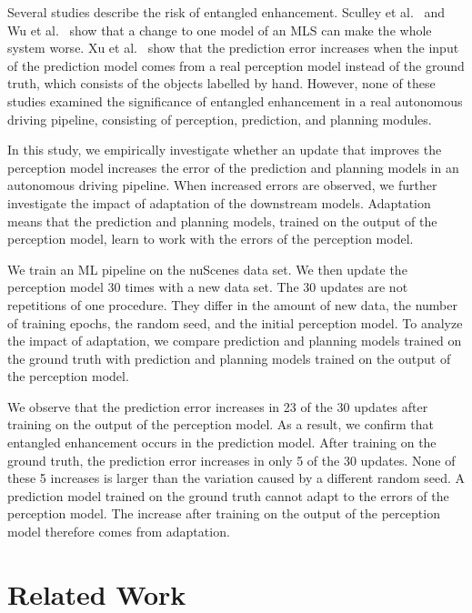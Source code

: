 \documentclass[conference]{IEEEtran}
\begin{document}
Several studies describe the risk of entangled enhancement. Sculley et al.~\cite{sculley2015hidden} and Wu et al.~\cite{wu2021fixesthatfail} show that a change to one model of an MLS can make the whole system worse. Xu et al.~\cite{xu2024realworld} show that the prediction error increases when the input of the prediction model comes from a real perception model instead of the ground truth, which consists of the objects labelled by hand. However, none of these studies examined the significance of entangled enhancement in a real autonomous driving pipeline, consisting of perception, prediction, and planning modules.

In this study, we empirically investigate whether an update that improves the perception model increases the error of the prediction and planning models in an autonomous driving pipeline. When increased errors are observed, we further investigate the impact of adaptation of the downstream models. Adaptation means that the prediction and planning models, trained on the output of the perception model, learn to work with the errors of the perception model.

We train an ML pipeline on the nuScenes data set. We then update the perception model 30 times with a new data set. The 30 updates are not repetitions of one procedure. They differ in the amount of new data, the number of training epochs, the random seed, and the initial perception model. To analyze the impact of adaptation, we compare prediction and planning models trained on the ground truth with prediction and planning models trained on the output of the perception model.

We observe that the prediction error increases in 23 of the 30 updates after training on the output of the perception model. As a result, we confirm that entangled enhancement occurs in the prediction model. After training on the ground truth, the prediction error increases in only 5 of the 30 updates. None of these 5 increases is larger than the variation caused by a different random seed. A prediction model trained on the ground truth cannot adapt to the errors of the perception model. The increase after training on the output of the perception model therefore comes from adaptation.

\section{Related Work}
\end{document}
